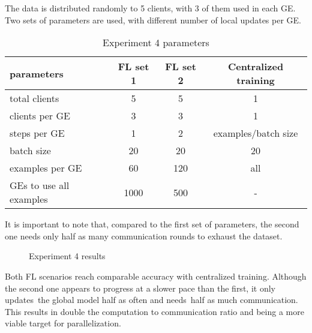 The data is distributed randomly to 5 clients, with 3 of them used in each GE. Two sets of parameters are used, with different number of local updates per GE.
\begin{table}[H]
    \center
    \begin{tabular}
        { | l | c | c | c | }
        \hline
        parameters & FL set 1 & FL set 2 & Centralized training\\\hline
        total clients & 5 & 5 & 1\\\hline
        clients per GE & 3 & 3 & 1\\\hline
        steps per GE & 1 & 2 & examples/batch size \\\hline
        batch size & 20  & 20  & 20 \\\hline
        examples per GE & 60  & 120  & all \\\hline
        GEs to use all examples & 1000  & 500  & - \\\hline
    \end{tabular}
    \caption[Experiment 4 parameters]{Experiment 4 parameters}
    \label{table:Experiment 4 parameters}
\end{table}
It is important to note that, compared to the first set of parameters, the second one needs only half as many communication rounds to exhaust the dataset.
    
\begin{figure}[H]
    \center
    
    \caption[Experiment 4 results]{Experiment 4 results}
    \label{fig:Experiment 4 results}
\end{figure}
Both FL scenarios reach comparable accuracy with centralized training. Although the second one appears to progress at a slower pace than the first, it only updates the global model half as often and needs half as much communication. This results in double the computation to communication ratio and being a more viable target for parallelization.

